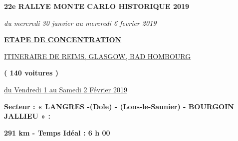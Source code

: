 \documentclass{article}%
\begin{document}
%
\normalsize%
\begin{center} \textbf{\LARGE{22e RALLYE MONTE CARLO HISTORIQUE 2019}} \end{center}%
\begin{center} \textit{du mercredi 30 janvier au mercredi 6 fevrier 2019} \end{center}%
\begin{center} \textbf{\underline{ETAPE DE CONCENTRATION}} \end{center}%
\begin{center} \underline{ITINERAIRE DE  REIMS, GLASGOW, BAD HOMBOURG} \end{center}%
\begin{center} \textbf{( 140 voitures )} \end{center}%
\begin{flushright} \underline{du  Vendredi 1 au Samedi 2 Février 2019} \end{flushright}%
\begin{flushleft} \textbf{Secteur : « LANGRES -(Dole) - (Lons-le-Saunier) - BOURGOIN  JALLIEU » :
} \end{flushleft}%
\begin{flushright} \textbf{291 km - Temps Idéal : 6 h 00
} \end{flushright}%
\end{document}
